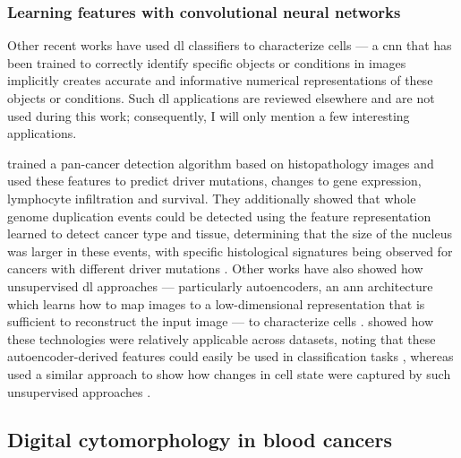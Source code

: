 \subsubsection{Learning features with convolutional neural networks}

Other recent works have used \ac{dl} classifiers to characterize cells --- a \ac{cnn} that has been trained to correctly identify specific objects or conditions in images implicitly creates accurate and informative numerical representations of these objects or conditions. Such \ac{dl} applications are reviewed elsewhere \cite{Moen2019-py,Pratapa2021-ee} and are not used during this work; consequently, I will only mention a few interesting applications. 

 trained a pan-cancer detection algorithm based on histopathology images and used these features to predict driver mutations, changes to gene expression, lymphocyte infiltration and survival. They additionally showed that whole genome duplication events could be detected using the feature representation learned to detect cancer type and tissue, determining that the size of the nucleus was larger in these events, with specific histological signatures being observed for cancers with different driver mutations \cite{Fu2020-mx}. Other works have also showed how unsupervised \ac{dl} approaches --- particularly autoencoders, an \ac{ann} architecture which learns how to map images to a low-dimensional representation that is sufficient to reconstruct the input image --- to characterize cells \cite{Sommer2017-uj,Wei2021-gw}.  showed how these technologies were relatively applicable across datasets, noting that these autoencoder-derived features could easily be used in classification tasks \cite{Wei2021-gw}, whereas  used a similar approach to show how changes in cell state were captured by such unsupervised approaches \cite{Sommer2017-uj}.

\subsection{Digital cytomorphology in blood cancers}

